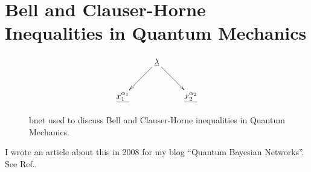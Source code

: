 \chapter{Bell  
and Clauser-Horne Inequalities 
in Quantum Mechanics}

\begin{figure}[h!]
\centering
$$\xymatrix{
&\ul{\lambda}\ar[dr]\ar[dl]&\\
\ul{x_1^{\alpha_1}}&&\ul{x_2^{\alpha_2}}
}$$
\caption{bnet used to discuss Bell 
and Clauser-Horne inequalities 
in Quantum Mechanics.}
\label{fig-bell}
\end{figure}

I wrote an article about
this in 2008 for
my blog \enquote{Quantum Bayesian Networks}.
See Ref.\cite{bell-blog}.